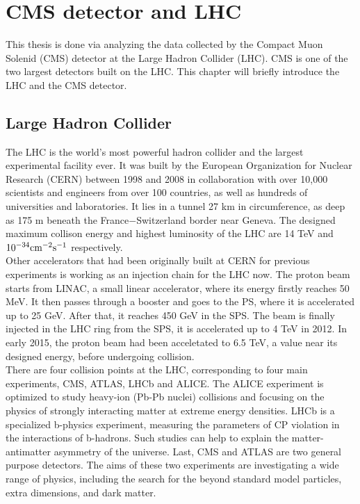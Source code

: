 \chapter{CMS detector and LHC}
This thesis is done via analyzing the data collected by the Compact Muon Solenid (CMS) detector at the Large Hadron Collider (LHC). CMS is one of the two largest detectors built on the LHC. This chapter will briefly introduce the LHC and the CMS detector.

\section{Large Hadron Collider}
The LHC is the world's most powerful hadron collider and the largest experimental facility ever. It was built by the European Organization for Nuclear Research (CERN) between 1998 and 2008 in collaboration with over 10,000 scientists and engineers from over 100 countries, as well as hundreds of universities and laboratories. It lies in a tunnel 27 km in circumference, as deep as 175 m beneath the France$-$Switzerland border near Geneva. The designed maximum collison energy and highest luminosity of the LHC are 14 TeV and $\textup{10}^{-34} \textup{cm}^{-2}\textup{s}^{-1}$ respectively.\\
Other accelerators that had been originally built at CERN for previous experiments is working as an injection chain for the LHC now. The proton beam starts from LINAC, a small linear accelerator, where its energy firstly reaches 50 MeV. It then passes through a booster and goes to the PS, where it is accelerated up to 25 GeV. After that, it reaches 450 GeV in the SPS. The beam is finally injected in the LHC ring from the SPS, it is accelerated up to 4 TeV in 2012. In early 2015, the proton beam had been acceletated to 6.5 TeV, a value near its designed energy, before undergoing collision.\\
There are four collision points at the LHC, corresponding to four main experiments, CMS, ATLAS, LHCb and ALICE. The ALICE experiment is optimized to study heavy-ion (Pb-Pb nuclei) collisions and focusing on the physics of strongly interacting matter at extreme energy densities. LHCb is a specialized b-physics experiment, measuring the parameters of CP violation in the interactions of b-hadrons. Such studies can help to explain the matter-antimatter asymmetry of the universe. Last, CMS and ATLAS are two general purpose detectors. The aims of these two experiments are investigating a wide range of physics, including the search for the beyond standard model particles, extra dimensions, and dark matter.


